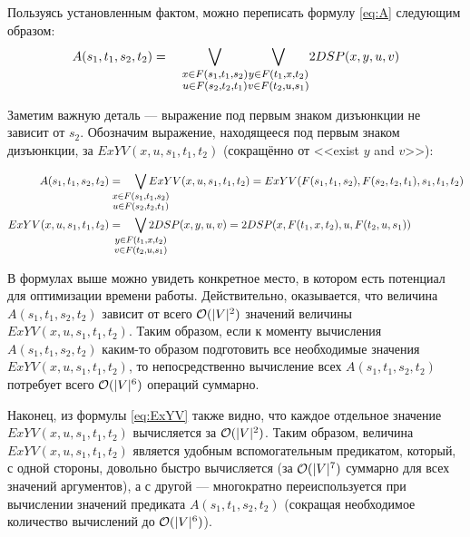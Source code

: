 Пользуясь установленным фактом, можно переписать формулу \eqref{eq:A} следующим образом:
\begin{equation} 
    A(s_1, t_1, s_2, t_2) = \quad
        {\bigvee_{
        \large \substack{
            x \in F(s_1, t_1, s_2)\\ 
            u \in F(s_2, t_2, t_1) 
        }
        }}
        {\bigvee_{
        \large \substack{
            y \in F(t_1, x, t_2)\\ 
            v \in F(t_2, u, s_1) 
        }
        }} 2DSP(x, y, u, v)
\end{equation}

Заметим важную деталь --- выражение под первым знаком дизъюнкции не зависит от $s_2$. Обозначим выражение, находящееся под первым знаком дизъюнкции, за $ExYV(x, u, s_1, t_1, t_2)$ (сокращённо от <<exist $y$ and $v$>>):

\begin{align} \label{eq:ExYV}
    A(s_1, t_1, s_2, t_2) &= \quad
       \smashoperator{\bigvee_{
        \large \substack{
            x \in F(s_1, t_1, s_2)\\ 
            u \in F(s_2, t_2, t_1) 
        }
        }} ExYV(x, u, s_1, t_1, t_2) = ExYV(F(s_1, t_1, s_2), F(s_2, t_2, t_1), s_1, t_1, t_2)\\
    ExYV(x, u, s_1, t_1, t_2) &= \quad
        \smashoperator{\bigvee_{
        \large \substack{
            y \in F(t_1, x, t_2)\\ 
            v \in F(t_2, u, s_1) 
        }
        }} 2DSP(x, y, u, v) = 2DSP(x, F(t_1, x, t_2), u, F(t_2, u, s_1))\\ 
\end{align}

В формулах выше можно увидеть конкретное место, в котором есть потенциал для оптимизации времени работы. Действительно, оказывается, что величина $A(s_1, t_1, s_2, t_2)$ зависит от всего $\mathcal{O}(|V|^2)$ значений величины $ExYV(x, u, s_1, t_1, t_2)$. Таким образом, если к моменту вычисления $A(s_1, t_1, s_2, t_2)$ каким-то образом подготовить все необходимые значения $ExYV(x, u, s_1, t_1, t_2)$, то непосредственно вычисление всех $A(s_1, t_1, s_2, t_2)$ потребует всего $\mathcal{O}(|V|^6)$ операций суммарно.

Наконец, из формулы \eqref{eq:ExYV} также видно, что каждое отдельное значение $ExYV(x, u, s_1, t_1, t_2)$ вычисляется за $\mathcal{O}(|V|^2)$. Таким образом, величина $ExYV(x, u, s_1, t_1, t_2)$ является удобным вспомогательным предикатом, который, с одной стороны, довольно быстро вычисляется (за $\mathcal{O}(|V|^7)$ суммарно для всех значений аргументов), а с другой --- многократно переиспользуется при вычислении значений предиката $A(s_1, t_1, s_2, t_2)$ (сокращая необходимое количество вычислений до $\mathcal{O}(|V|^6)$).

